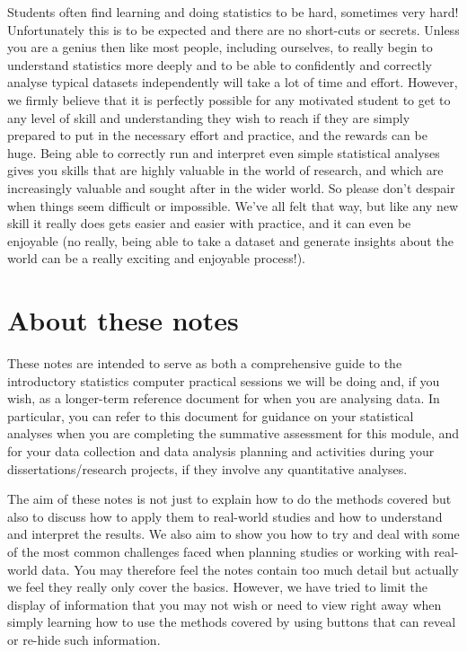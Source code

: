 \documentclass[
]{book}
\begin{document}
Students often find learning and doing statistics to be hard, sometimes very hard! Unfortunately this is to be expected and there are no short-cuts or secrets. Unless you are a genius then like most people, including ourselves, to really begin to understand statistics more deeply and to be able to confidently and correctly analyse typical datasets independently will take a lot of time and effort. However, we firmly believe that it is perfectly possible for any motivated student to get to any level of skill and understanding they wish to reach if they are simply prepared to put in the necessary effort and practice, and the rewards can be huge. Being able to correctly run and interpret even simple statistical analyses gives you skills that are highly valuable in the world of research, and which are increasingly valuable and sought after in the wider world. So please don't despair when things seem difficult or impossible. We've all felt that way, but like any new skill it really does gets easier and easier with practice, and it can even be enjoyable (no really, being able to take a dataset and generate insights about the world can be a really exciting and enjoyable process!).

\hypertarget{about-these-notes}{%
\section{About these notes}\label{about-these-notes}}

These notes are intended to serve as both a comprehensive guide to the introductory statistics computer practical sessions we will be doing and, if you wish, as a longer-term reference document for when you are analysing data. In particular, you can refer to this document for guidance on your statistical analyses when you are completing the summative assessment for this module, and for your data collection and data analysis planning and activities during your dissertations/research projects, if they involve any quantitative analyses.

The aim of these notes is not just to explain how to do the methods covered but also to discuss how to apply them to real-world studies and how to understand and interpret the results. We also aim to show you how to try and deal with some of the most common challenges faced when planning studies or working with real-world data. You may therefore feel the notes contain too much detail but actually we feel they really only cover the basics. However, we have tried to limit the display of information that you may not wish or need to view right away when simply learning how to use the methods covered by using buttons that can reveal or re-hide such information.
\end{document}
